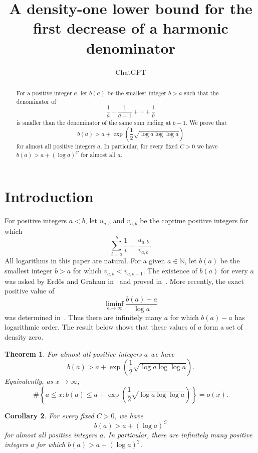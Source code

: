 \documentclass{amsart}
\newtheorem{theorem}{Theorem}
\newtheorem{corollary}[theorem]{Corollary}
\begin{document}
\title[A density-one lower bound]{A density-one lower bound for the first decrease of a harmonic denominator}

\author{ChatGPT}
\address{}
\email{}
\date{}

\begin{abstract}
For a positive integer $a$, let $b(a)$ be the smallest integer $b>a$ such that the denominator of
$$
\frac{1}{a}+\frac{1}{a+1}+\cdots+\frac{1}{b}
$$
is smaller than the denominator of the same sum ending at $b-1$. We prove that
$$
b(a)>a+\exp\left(\frac12\sqrt{\log a\log\log a}\right)
$$
for almost all positive integers $a$. In particular, for every fixed $C>0$ we have $b(a)>a+(\log a)^C$ for almost all $a$.
\end{abstract}

\maketitle

\section{Introduction}
For positive integers $a<b$, let $u_{a,b}$ and $v_{a,b}$ be the coprime positive integers for which
$$
\sum_{i=a}^b\frac1i=\frac{u_{a,b}}{v_{a,b}}.
$$
All logarithms in this paper are natural. For a given $a\in\mathbb N$, let $b(a)$ be the smallest integer $b>a$ for which $v_{a,b}<v_{a,b-1}$. The existence of $b(a)$ for every $a$ was asked by Erd\H{o}s and Graham in~\cite{cnt} and proved in~\cite{VD}. More recently, the exact positive value of
$$
\liminf_{a\to\infty}\frac{b(a)-a}{\log a}
$$
was determined in~\cite{shortest}. Thus there are infinitely many $a$ for which $b(a)-a$ has logarithmic order. The result below shows that these values of $a$ form a set of density zero.

\begin{theorem}\label{main}
For almost all positive integers $a$ we have
$$
b(a)>a+\exp\left(\frac12\sqrt{\log a\log\log a}\right).
$$
Equivalently, as $x\to\infty$,
$$
\#\left\{a\le x:b(a)\le a+\exp\left(\frac12\sqrt{\log a\log\log a}\right)\right\}=o(x).
$$
\end{theorem}

\begin{corollary}\label{powers}
For every fixed $C>0$, we have
$$
b(a)>a+(\log a)^C
$$
for almost all positive integers $a$. In particular, there are infinitely many positive integers $a$ for which $b(a)>a+(\log a)^2$.
\end{corollary}
\end{document}
